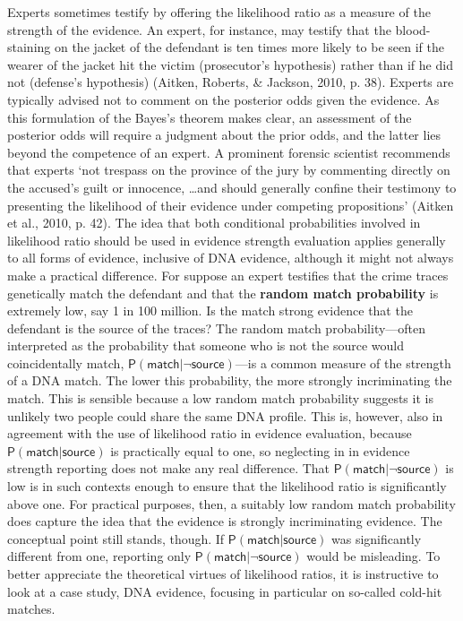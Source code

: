 \documentclass[10pt,dvipsnames,enabledeprecatedfontcommands]{scrartcl}
\newcommand{\pr}[1]{\mathsf{P}(#1)}
\begin{document}
Experts sometimes testify by offering the likelihood ratio as a measure
of the strength of the evidence. An expert, for instance, may testify
that the blood-staining on the jacket of the defendant is ten times more
likely to be seen if the wearer of the jacket hit the victim
(prosecutor's hypothesis) rather than if he did not (defense's
hypothesis) (Aitken, Roberts, \& Jackson, 2010, p. 38). Experts are
typically advised not to comment on the posterior odds given the
evidence. As this formulation of the Bayes's theorem makes clear, an
assessment of the posterior odds will require a judgment about the prior
odds, and the latter lies beyond the competence of an expert. A
prominent forensic scientist recommends that experts `not trespass on
the province of the jury by commenting directly on the accused's guilt
or innocence, \dots and should generally confine their testimony to
presenting the likelihood of their evidence under competing
propositions' (Aitken et al., 2010, p. 42). The idea that both
conditional probabilities involved in likelihood ratio should be used in
evidence strength evaluation applies generally to all forms of evidence,
inclusive of DNA evidence, although it might not always make a practical
difference. For suppose an expert testifies that the crime traces
genetically match the defendant and that the
\textbf{random match probability} is extremely low, say 1 in 100
million. Is the match strong evidence that the defendant is the source
of the traces? The random match probability---often interpreted as the
probability that someone who is not the source would coincidentally
match, \(\pr{\textsf{match} \vert \neg \textsf{source}}\)---is a common
measure of the strength of a DNA match. The lower this probability, the
more strongly incriminating the match. This is sensible because a low
random match probability suggests it is unlikely two people could share
the same DNA profile. This is, however, also in agreement with the use
of likelihood ratio in evidence evaluation, because
\(\pr{\textsf{match} \vert \textsf{source}}\) is practically equal to
one, so neglecting in in evidence strength reporting does not make any
real difference. That \(\pr{\textsf{match} \vert \neg \textsf{source}}\)
is low is in such contexts enough to ensure that the likelihood ratio is
significantly above one. For practical purposes, then, a suitably low
random match probability does capture the idea that the evidence is
strongly incriminating evidence. The conceptual point still stands,
though. If \(\pr{\textsf{match} \vert \textsf{source}}\) was
significantly different from one, reporting only
\(\pr{\textsf{match} \vert \neg \textsf{source}}\) would be misleading.
To better appreciate the theoretical virtues of likelihood ratios, it is
instructive to look at a case study, DNA evidence, focusing in
particular on so-called cold-hit matches.
\end{document}
